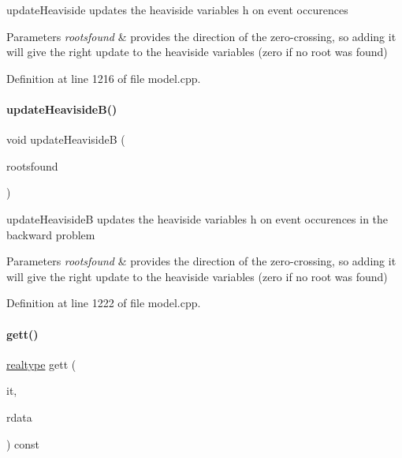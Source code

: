 update\+Heaviside updates the heaviside variables h on event occurences


\begin{DoxyParams}{Parameters}
{\em rootsfound} & provides the direction of the zero-\/crossing, so adding it will give the right update to the heaviside variables (zero if no root was found) \\
\hline
\end{DoxyParams}


Definition at line 1216 of file model.\+cpp.

\mbox{\label{classamici_1_1_model_a430edd546832d0abbea6472eb7e43da8}} 
\paragraph{\texorpdfstring{update\+Heaviside\+B()}{updateHeavisideB()}}
{\footnotesize\ttfamily void update\+HeavisideB (\begin{DoxyParamCaption}\item[{const int $\ast$}]{rootsfound }\end{DoxyParamCaption})}

update\+HeavisideB updates the heaviside variables h on event occurences in the backward problem


\begin{DoxyParams}{Parameters}
{\em rootsfound} & provides the direction of the zero-\/crossing, so adding it will give the right update to the heaviside variables (zero if no root was found) \\
\hline
\end{DoxyParams}


Definition at line 1222 of file model.\+cpp.

\mbox{\label{classamici_1_1_model_a09e0a747a99fb59657e71690ce69726b}} 
\paragraph{\texorpdfstring{gett()}{gett()}}
{\footnotesize\ttfamily \mbox{\hyperlink{namespaceamici_a1bdce28051d6a53868f7ccbf5f2c14a3}{realtype}} gett (\begin{DoxyParamCaption}\item[{const int}]{it,  }\item[{const \mbox{\hyperlink{classamici_1_1_return_data}{Return\+Data}} $\ast$}]{rdata }\end{DoxyParamCaption}) const}

